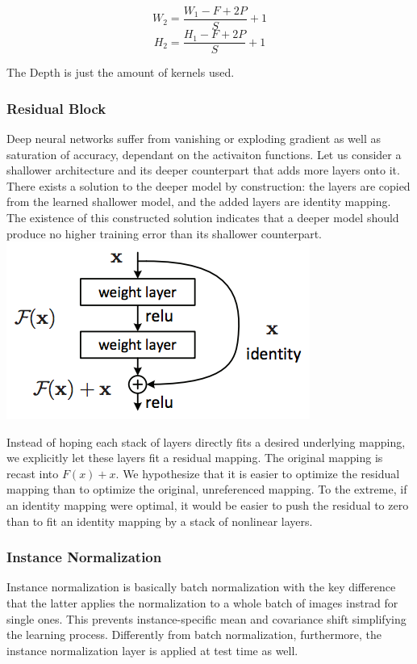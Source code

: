 \documentclass[11pt]{article}
\makeatletter
\def\maxwidth{\ifdim\Gin@nat@width>\linewidth\linewidth
    \else\Gin@nat@width\fi}
\let\Oldincludegraphics\includegraphics
\renewcommand{\includegraphics}[1]{\Oldincludegraphics[width=.8\maxwidth]{#1}}
\makeatother
\begin{document}
\[W_2= \frac{W_1-F+2P}{S}+1\] \[H_2= \frac{H_1-F+2P}{S}+1\]

The Depth is just the amount of kernels used.

\subsubsection{Residual Block}\label{residual-block}

Deep neural networks suffer from vanishing or exploding gradient as well
as saturation of accuracy, dependant on the activaiton functions. Let us
consider a shallower architecture and its deeper counterpart that adds
more layers onto it. There exists a solution to the deeper model by
construction: the layers are copied from the learned shallower model,
and the added layers are identity mapping. The existence of this
constructed solution indicates that a deeper model should produce no
higher training error than its shallower counterpart.
\includegraphics{res_struc.png}

Instead of hoping each stack of layers directly fits a desired
underlying mapping, we explicitly let these layers fit a residual
mapping. The original mapping is recast into \(F(x)+x\). We hypothesize
that it is easier to optimize the residual mapping than to optimize the
original, unreferenced mapping. To the extreme, if an identity mapping
were optimal, it would be easier to push the residual to zero than to
fit an identity mapping by a stack of nonlinear layers.

\subsubsection{Instance Normalization}\label{instance-normalization}

Instance normalization is basically batch normalization with the key
difference that the latter applies the normalization to a whole batch of
images instrad for single ones. This prevents instance-specific mean and
covariance shift simplifying the learning process. Differently from
batch normalization, furthermore, the instance normalization layer is
applied at test time as well.
\end{document}
